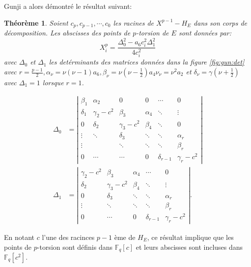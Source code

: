 \documentclass[10pt,a4paper]{book}
\theoremstyle{plain}
\newtheorem{thm}{Théorème}[chapter]
\theoremstyle{definition}
\theoremstyle{definition}
\theoremstyle{definition}
\theoremstyle{definition}
\theoremstyle{remark}
\theoremstyle{remark}
\theoremstyle{definition}
\begin{document}
Gunji a alors démontré le résultat suivant:

\begin{thm}
\label{thm:Gunji}
Soient $c_p, c_{p-1}, \cdots, c_{0}$ les racines de $X^{p-1}-H_{E}$ dans son corps de décomposition. Les abscisses des points de $p$-torsion de $E$ sont données par: 
\begin{equation*}
X^{p}_i=\frac{\Delta_0^2-a_6c_i^2\Delta_1^2}{4c_i^2}
\end{equation*}
avec $\Delta_0$ et $\Delta_1$ les detérminants des matrices données dans la figure \ref{fig:gun:det} avec $r=\frac{p-1}{2}, \alpha_{\nu}=\nu (\nu -1 ) a_6, \beta_{\nu}=\nu(\nu-\frac{1}{2})a_4 \nu_{\nu}=\nu^2a_2$ et $\delta_{\nu}=\gamma(\nu + \frac{1}{2})$ avec $\Delta_1=1$ lorsque $r=1$.
\end{thm}


\begin{equation*}
\begin{alignedat}{1}
\Delta_0 &=\left| 
\begin{matrix}
\beta_1 & \alpha_2 & 0 & 0 & \cdots & 0\\
\delta_1 & \gamma_2 - c^2 & \beta_3 & \alpha_4 & \ddots & \vdots \\
0 & \delta_2 & \gamma_3 - c^2 & \beta_4 & \ddots & 0 \\
\vdots & \ddots & \delta_3 & \ddots & \ddots & \alpha_r \\
\vdots & & \ddots  & \ddots & \ddots & \beta_r \\
0 & \cdots & \cdots & 0 & \delta_{r-1} & \gamma_r - c^2 
\end{matrix}
\right| \\
\Delta_1 &= \left| 
\begin{matrix}
\gamma_2-c^2 & \beta_3 & \alpha_4 & \cdots & 0 \\
\delta_2 & \gamma_3 - c^2 & \beta_4 & \ddots & \vdots \\
0 & \delta_3 & \ddots & \ddots & \alpha_r \\
\vdots & \ddots & \ddots & \ddots & \beta_r \\
0 & \cdots & 0 & \delta_{r-1} & \gamma_r-c^2
\end{matrix}
\right|.
\end{alignedat}
\end{equation*}


En notant $c$ l'une des racinces $p-1$ ème de $H_E$, ce résultat implique que les points de $p$-torsion sont définis dans $\mathbb{F}_q[c]$ et leurs abscisses sont incluses dans $\mathbb{F}_q[c^2]$.
\end{document}
